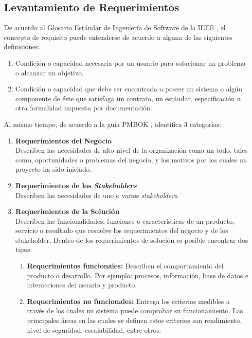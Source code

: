 \subsection{Levantamiento de Requerimientos \label{sec:requirements}}

De acuerdo al Glosario Estándar de Ingeniería de Software de la IEEE \cite{ieee_glosary}, el concepto de requisito puede entenderse de acuerdo a alguna de las siguientes definiciones:

\begin{enumerate}
  \item Condición o capacidad necesaria por un usuario para solucionar un problema o alcanzar un objetivo.
  \item Condición o capacidad que debe ser encontrada o poseer un sistema o algún componente de éste que satisfaga un contrato, un estándar, especificación u otra formalidad impuesta por documentación.
\end{enumerate}

Al mismo tiempo, de acuerdo a la guía PMBOK \cite{pmbok_guide}, identifica 3 categorías:

\begin{enumerate}
  \item \textbf{Requerimientos del Negocio}\mbox{}\\ Describen las necesidades de alto nivel de la organización como un todo, tales como, oportunidades o problemas del negocio, y los motivos por los cuales un proyecto ha sido iniciado.
  \item \textbf{Requerimientos de los \textit{Stakeholders}}\mbox{}\\ Describen las necesidades de uno o varios \textit{stakeholders}.
  \item \textbf{Requerimientos de la Solución} \mbox{} \\ Describen las funcionalidades, funciones o características de un producto, servicio o resultado que resuelve los requerimientos del negocio y de los stakeholder. Dentro de los requerimientos de solución es posible encontrar dos tipos:
    \begin{enumerate}
      \item \textbf{Requerimientos funcionales:} Describen el comportamiento del producto o desarrollo. Por ejemplo: procesos, información, base de datos e interacciones del usuario y producto.
      \item \textbf{Requerimientos no funcionales:} Entrega los criterios medibles a través de los cuales un sistema puede comprobar su funcionamiento. Las principales áreas en las cuales se definen estos criterios son rendimiento, nivel de seguridad, escalabilidad, entre otros.
    \end{enumerate}
\end{enumerate}

